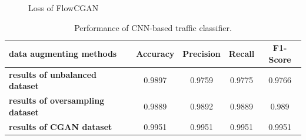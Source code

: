 \documentclass[conference]{IEEEtran}
\begin{document}
\begin{figure}[htbp]
\centering
{}%
%
\caption{Loss of FlowCGAN}
\label{cgan_loss}
\end{figure}

\begin{table}[htb]
	\centering
	\fontsize{6.5}{8}
	\caption{Performance of CNN-based traffic classifier.}\label{table:performance_classifier}
	\begin{tabular}{|l|c|c|c|c|}%
		\hline
		data augmenting methods & Accuracy & Precision & Recall & F1-Score \\
		\hline
		\textbf{results of unbalanced dataset}  & 0.9897 & 0.9759 & 0.9775 &  0.9766 \\
		\hline
		\textbf{results of oversampling dataset}   & 0.9889 & 0.9892 & 0.9889& 0.989 \\
		\hline
		\textbf{results of CGAN dataset}   & 0.9951 & 0.9951 & 0.9951  & 0.9951 \\
		\hline
	\end{tabular}
\end{table}
\end{document}
